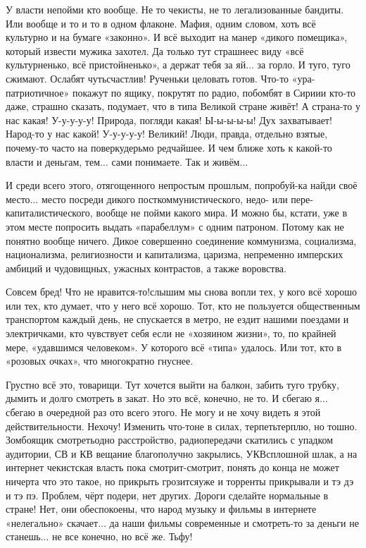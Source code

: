 У власти непойми кто вообще. Не то чекисты, не то легализованные бандиты. Или вообще и то и то в одном флаконе. Мафия, одним словом, хоть всё культурно и на бумаге «законно». И всё выходит на манер «дикого помещика», который извести мужика захотел. Да только тут страшнее\mdash с виду «всё культурненько, всё пристойненько», а держат тебя за яй$\ldots$ за горло. И туго, туго сжимают. Ослабят чуть\mdash счастлив! Рученьки целовать готов. Что-то «ура-патриотичное» покажут по ящику, покрутят по радио, побомбят в Сирии\mdash и кто-то даже, страшно сказать, подумает, что в типа Великой стране живёт! А страна-то у нас какая! У-у-у-у-у! Природа, погляди какая! Ы-ы-ы-ы-ы! Дух захватывает! Народ-то у нас какой! У-у-у-у-у! Великий! Люди, правда, отдельно взятые, почему-то часто на поверку\mdash дерьмо редчайшее. И чем ближе хоть к какой-то власти и деньгам, тем$\ldots$ сами понимаете. Так и живём$\ldots$

И среди всего этого, отягощенного непростым прошлым, попробуй-ка найди своё место$\ldots$ место посреди дикого посткоммунистического, недо- или пере- капиталистического, вообще не пойми какого мира. И можно бы, кстати, уже в этом месте попросить выдать «парабеллум» с одним патроном. Потому как не понятно вообще ничего. Дикое совершенно соединение коммунизма, социализма, национализма, религиозности и капитализма, царизма, непременно имперских амбиций и чудовищных, ужасных контрастов, а также воровства. 

\mdash Совсем бред! Что не нравится-то!\mdash слышим мы снова вопли тех, у кого всё хорошо или тех, кто думает, что у него всё хорошо. Тот, кто не пользуется общественным транспортом каждый день, не спускается в метро, не ездит нашими поездами и электричками, кто чувствует себя если не «хозяином жизни», то, по крайней мере, «удавшимся человеком». У которого всё «типа» удалось. Или тот, кто в «розовых очках», что многократно гнуснее.

Грустно всё это, товарищи. Тут хочется выйти на балкон, забить туго трубку, дымить и долго смотреть в закат. Но это всё, конечно, не то. И сбегаю я$\ldots$ сбегаю в очередной раз ото всего этого. Не могу и не хочу видеть я этой действительности. Не\sdash хо\sdash чу! Изменить что-то\mdash не в силах, терпеть\mdash терплю, но тошно. Зомбоящик смотреть\mdash одно расстройство, радиопередачи скатились с упадком аудитории, СВ и КВ вещание благополучно закрылись, УКВ\mdash сплошной шлак, а на интернет чекистская власть пока смотрит-смотрит, понять до конца не может ничерта что это такое, но прикрыть грозится\mdash уже и торренты прикрывали и тэ дэ и тэ пэ. Проблем, чёрт подери, нет других. Дороги сделайте нормальные в стране! Нет, они обеспокоены, что народ музыку и фильмы в интернете «нелегально» скачает$\ldots$ да наши фильмы современные и смотреть-то за деньги не станешь$\ldots$ не все конечно, но всё же. Тьфу!

